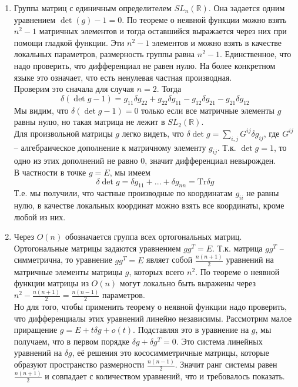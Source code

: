 \documentclass[12pt]{article}
\theoremstyle{definition}
\begin{document}
\begin{enumerate}
    \item Группа матриц с единичным определителем $SL_n(\mathbb{R})$. Она задается одним уравнением $\det(g)-1=0$. По теореме о неявной функции можно взять $n^2-1$ матричных элементов и тогда оставшийся выражается через них при помощи гладкой функции. Эти $n^2-1$ элементов и можно взять в качестве локальных параметров, размерность группы равна $n^2-1$. Единственное, что надо проверить, что дифференциал не равен нулю. На более конкретном языке это означает, что есть ненулевая частная производная.\\
    Проверим это сначала для случая $n=2$. Тогда
    \begin{equation}
        \delta(\det g-1)=g_{11}\delta g_{22}+g_{22}\delta g_{11}-g_{12}\delta g_{21}-g_{21}\delta g_{12}
    \end{equation}
    Мы видим, что $\delta(\det g-1) = 0$ только если все матричные элементы $g$ равны нулю, но такая матрица не лежит в $SL_2(\mathbb{R})$.\\
    Для произвольной матрицы $g$ легко видеть, что $\delta \det g=\sum\limits_{i,j}G^{ij}\delta g_{ij}$, где $G^{ij}$ -- алгебраическое дополнение к матричному элементу $g_{ij}$. Т.к. $\det g = 1$, то одно из этих дополнений не равно 0, значит дифференциал невырожден.\\
    В частности в точке $g=E$, мы имеем
    \begin{equation}
        \delta \det g=\delta g_{11}+...+\delta g_{nn}=\text{Tr} \delta g
    \end{equation}
    Т.е. мы получили, что частные производные по координатам $g_{ii}$ не равны нулю, в качестве локальных координат можно взять все координаты, кроме любой из них.
    \item Через $O(n)$ обозначается группа всех ортогональных матриц. Ортогональные матрицы задаются уравнением $gg^T=E$. Т.к. матрица $gg^T$ -- симметрична, то уравнение $gg^T=E$ являет собой $\frac{n(n+1)}{2}$ уравнений на матричные элементы матрицы $g$, которых всего $n^2$. По теореме о неявной функции матрицы из $O(n)$ могут локально быть выражены через $n^2-\frac{n(n+1)}{2}=\frac{n(n-1)}{2}$ параметров.\\
    Но для того, чтобы применить теорему о неявной функции надо проверить, что дифференциалы этих уравнений линейно независимы. Рассмотрим малое приращение $g=E+t\delta g+o(t)$. Подставляя это в уравнение на $g$, мы получаем, что в первом порядке $\delta g+\delta g^T=0$. Это система линейных уравнений на $\delta g$, её решения это кососимметричные матрицы, которые образуют пространство размерности $\frac{n(n-1)}{2}$. Значит ранг системы равен $\frac{n(n+1)}{2}$ и совпадает с количеством уравнений, что и требовалось показать.

\end{enumerate}
\end{document}
